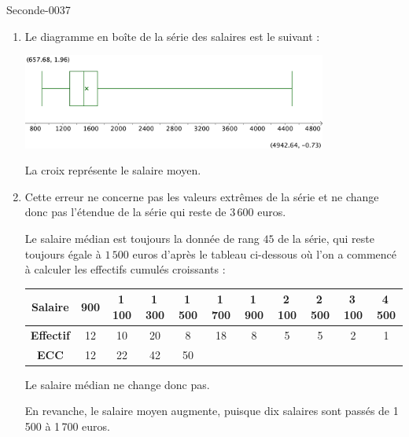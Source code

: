 \begin{corrige}{Seconde-0037}
\begin{enumerate}
\item Le diagramme en boîte de la série des salaires est le suivant :

    \begin{center}
    \includegraphics[width=10cm]{DS8_FigCor_Ex2}
    \end{center}
  
  La croix représente le salaire moyen.

\item Cette erreur ne concerne pas les valeurs extrêmes de la série et
  ne change donc pas l'étendue de la série qui reste de $3\,600$
  euros.

  Le salaire médian est toujours la donnée de rang $45$ de la série,
  qui reste toujours égale à $1\,500$ euros d'après le tableau
  ci-dessous où l'on a commencé à calculer les effectifs cumulés
  croissants : 


  \begin{center}
  \begin{tabular}{|c||c|c|c|c|c|c|c|c|c|c|}
    \hline 
    \textbf{Salaire} &900&1\,100&1\,300&1\,500&1\,700&1\,900&2\,100&2\,500&3\,100&4\,500\\
    \hline 
    \textbf{Effectif} &12&10&20&8&18&8&5&5&2&1\\
    \hline 
    \textbf{ECC} &12&22&42&50&&&&&&\\
    \hline
  \end{tabular}
  \end{center}

  Le salaire médian ne change donc pas.

  \smallskip

  En revanche, le salaire moyen augmente, puisque dix salaires sont
  passés de 1\,500 à 1\,700 euros.
  
\end{enumerate}


\end{corrige}

